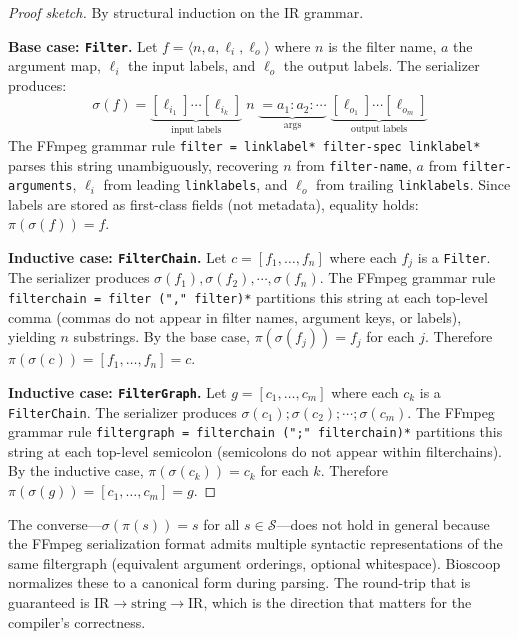 \documentclass[english,submission]{programming}
\begin{document}
\begin{proof}[Proof sketch]
By structural induction on the IR grammar.

\textbf{Base case: \texttt{Filter}.} Let $f = \langle n, a, \ell_i, \ell_o \rangle$ where $n$ is the filter name, $a$ the argument map, $\ell_i$ the input labels, and $\ell_o$ the output labels. The serializer produces:
\[
\sigma(f) = \underbrace{[\ell_{i_1}]\cdots[\ell_{i_k}]}_{\text{input labels}} \; n \; \underbrace{=a_1:a_2:\cdots}_{\text{args}} \; \underbrace{[\ell_{o_1}]\cdots[\ell_{o_m}]}_{\text{output labels}}
\]
The FFmpeg grammar rule \texttt{filter = linklabel* filter-spec linklabel*} parses this string unambiguously, recovering $n$ from \texttt{filter-name}, $a$ from \texttt{filter-arguments}, $\ell_i$ from leading \texttt{linklabels}, and $\ell_o$ from trailing \texttt{linklabels}. Since labels are stored as first-class fields (not metadata), equality holds: $\pi(\sigma(f)) = f$.

\textbf{Inductive case: \texttt{FilterChain}.} Let $c = [f_1, \ldots, f_n]$ where each $f_j$ is a \texttt{Filter}. The serializer produces $\sigma(f_1) \mathbin{,} \sigma(f_2) \mathbin{,} \cdots \mathbin{,} \sigma(f_n)$. The FFmpeg grammar rule \texttt{filterchain = filter ("," filter)*} partitions this string at each top-level comma (commas do not appear in filter names, argument keys, or labels), yielding $n$ substrings. By the base case, $\pi(\sigma(f_j)) = f_j$ for each $j$. Therefore $\pi(\sigma(c)) = [f_1, \ldots, f_n] = c$.

\textbf{Inductive case: \texttt{FilterGraph}.} Let $g = [c_1, \ldots, c_m]$ where each $c_k$ is a \texttt{FilterChain}. The serializer produces $\sigma(c_1) \mathbin{;} \sigma(c_2) \mathbin{;} \cdots \mathbin{;} \sigma(c_m)$. The FFmpeg grammar rule \texttt{filtergraph = filterchain (";" filterchain)*} partitions this string at each top-level semicolon (semicolons do not appear within filterchains). By the inductive case, $\pi(\sigma(c_k)) = c_k$ for each $k$. Therefore $\pi(\sigma(g)) = [c_1, \ldots, c_m] = g$.
\end{proof}

The converse---$\sigma(\pi(s)) = s$ for all $s \in \mathcal{S}$---does not hold in general because the FFmpeg serialization format admits multiple syntactic representations of the same filtergraph (equivalent argument orderings, optional whitespace). Bioscoop normalizes these to a canonical form during parsing. The round-trip that is guaranteed is $\text{IR} \rightarrow \text{string} \rightarrow \text{IR}$, which is the direction that matters for the compiler's correctness.
\end{document}
